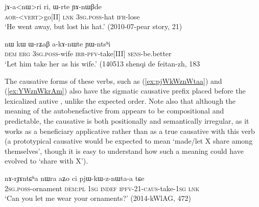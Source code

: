 \begin{exe}
\ex \label{ex:Wrte.YAnWBde2}
\gll jɤ-a<nɯ>ri ri, ɯ-rte ɲɤ-nɯβde \\
\textsc{aor}-<\textsc{vert}>go[II] \textsc{lnk} \textsc{3sg}.\textsc{poss}-hat \textsc{ifr}-lose\\
\glt `He went away, but lost his hat.' (2010-07-pear story, 21)
\end{exe}

\begin{exe}
\ex \label{ex:WrZaB.akAnWte}
\gll nɯ kɯ ɯ-rʑaβ a-kɤ-nɯte ɲɯ-ntsʰi \\
\textsc{dem} \textsc{erg} \textsc{3sg}.\textsc{poss}-wife \textsc{irr}-\textsc{pfv}-take[III] \textsc{sens}-be.better \\
\glt `Let him take her as his wife.' (140513 shenqi de feitan-zh, 183
\end{exe}

The causative forms of these  verbs, such as   (\ref{ex:pjWkWznWtaa}) and  (\ref{ex:YWznWkrAm}) also have the sigmatic causative prefix placed before the lexicalized autive , unlike the expected order.  Note also that although the meaning of the autobenefactive  from    appears to be compositional and predictable, the causative is both positionally and semantically irregular, as it works as a beneficiary applicative rather than as a true causative with this verb (a prototypical causative would be expected to mean `made/let X share among themselves', though it is easy to understand how such a meaning could have evolved to `share with X').

\begin{exe}
\ex \label{ex:pjWkWznWtaa}
\gll nɤ-rɟɤntɕʰa nɯra aʑo ci pjɯ-kɯ-z-nɯta-a tɕe \\
\textsc{2sg}.\textsc{poss}-ornament \textsc{dem}:\textsc{pl} \textsc{1sg} \textsc{indef} \textsc{ipfv}-2\fl{}1-\textsc{caus}-take-\textsc{1sg} \textsc{lnk} \\
\glt `Can you let me wear your ornaments?' (2014-kWlAG, 472)
\end{exe}

